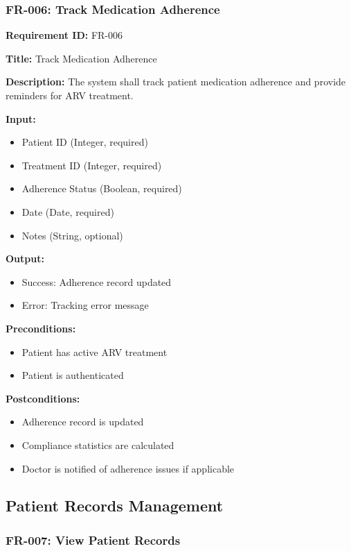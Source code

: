 \documentclass[12pt,a4paper]{article}
\begin{document}
\subsubsection{FR-006: Track Medication Adherence}

\textbf{Requirement ID:} FR-006

\textbf{Title:} Track Medication Adherence

\textbf{Description:} The system shall track patient medication adherence and provide reminders for ARV treatment.

\textbf{Input:}
\begin{itemize}
    \item Patient ID (Integer, required)
    \item Treatment ID (Integer, required)
    \item Adherence Status (Boolean, required)
    \item Date (Date, required)
    \item Notes (String, optional)
\end{itemize}

\textbf{Output:}
\begin{itemize}
    \item Success: Adherence record updated
    \item Error: Tracking error message
\end{itemize}

\textbf{Preconditions:}
\begin{itemize}
    \item Patient has active ARV treatment
    \item Patient is authenticated
\end{itemize}

\textbf{Postconditions:}
\begin{itemize}
    \item Adherence record is updated
    \item Compliance statistics are calculated
    \item Doctor is notified of adherence issues if applicable
\end{itemize}

\subsection{Patient Records Management}

\subsubsection{FR-007: View Patient Records}
\end{document}
